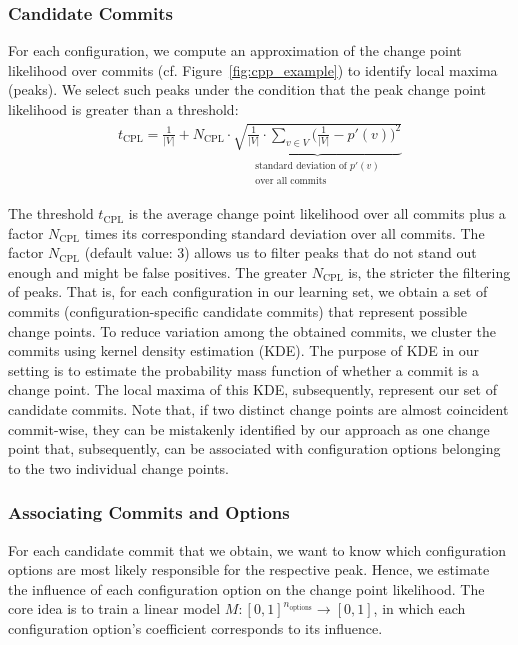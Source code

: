 \documentclass[sigconf]{acmart}
\begin{document}
	\subsubsection{Candidate Commits}
	For each configuration, we compute an approximation of the change point likelihood over commits (cf. Figure~\ref{fig:cpp_example}) to identify local maxima (peaks). We select such peaks under the condition that the peak change point likelihood is greater than a threshold:
	\begin{equation}
	\begin{gathered}
	t_\text{CPL} = \frac{1}{\vert V\vert} + N_\text{CPL} \cdot \underbrace{\sqrt{\frac{1}{\vert V\vert} \cdot \sum_{v \in V} \Big(\frac{1}{\vert V\vert} - p'(v)\Big)^2}}_{\substack{\text{standard deviation of } p'(v) \\ \text{over all commits} }}
	\label{eq:t_cpl}
	\end{gathered}
	\end{equation}
	
	The threshold $t_\text{CPL}$ is the average change point likelihood over all commits plus a factor $N_\text{CPL}$ times its corresponding standard deviation over all commits. 
	The factor $N_\text{CPL}$ (default value: 3) allows us to filter peaks that do not stand out enough and might be false positives. The greater $N_\text{CPL}$ is, the stricter the filtering of peaks. That is, for each configuration in our learning set, we obtain a set of commits (configuration-specific candidate commits) that represent possible change points.
	To reduce variation among the obtained commits, we cluster the commits using kernel density estimation (KDE). The purpose of KDE in our setting is to estimate the probability mass function of whether a commit is a change point. The local maxima of this KDE, subsequently, represent our set of candidate commits. Note that, if two distinct change points are almost coincident commit-wise, they can be mistakenly identified by our approach as one change point that, subsequently, can be associated with configuration options belonging to the two individual change points.
	
	\subsubsection{Associating Commits and Options}
	For each candidate commit that we obtain, we want to know which configuration options are most likely responsible for the respective peak. Hence, we estimate the influence  of each configuration option on the change point likelihood. The core idea is to train a linear model $M: [0,1]^{n_{\text{options}}} \rightarrow [0,1]$, in which each configuration option's coefficient corresponds to its influence. 
	
\end{document}
